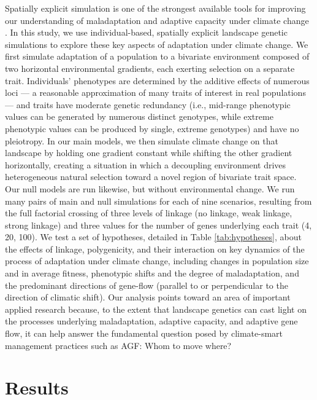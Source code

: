 \documentclass[9pt,twocolumn,twoside,lineno]{pnas-new}
\begin{document}
Spatially explicit simulation is one of the strongest available tools
for improving our understanding of maladaptation and adaptive capacity
under climate change \cite{capblancq_review}.
In this study, we use individual-based, spatially explicit landscape genetic simulations to
explore these key aspects of adaptation under climate change. We first simulate 
adaptation of a population to a bivariate environment composed of two horizontal 
environmental gradients, each exerting selection on a separate trait.
Individuals' phenotypes are determined by the additive effects of numerous loci ---
a reasonable approximation of many traits of interest in real populations \cite{sella} ---
and traits have moderate genetic redundancy 
(i.e., mid-range phenotypic values
can be generated by numerous distinct genotypes, while extreme phenotypic
values can be produced by single, extreme genotypes) and have no pleiotropy.
In our main models, we then simulate climate change on that landscape by holding one gradient 
constant while shifting the other gradient horizontally, creating a situation in which
a decoupling environment drives heterogeneous natural selection toward a novel region 
of bivariate trait space. Our null models are run likewise, but without environmental 
change. We run many pairs of main and null simulations for each of nine scenarios, 
resulting from the full factorial crossing of three levels of linkage (no linkage, weak 
linkage, strong linkage) and three values for the number of genes underlying each 
trait (4, 20, 100). We test a set of hypotheses, detailed 
in Table \ref{tab:hypotheses}, about the effects of linkage,
polygenicity, and their interaction on key 
dynamics of the process of adaptation under climate change, including changes in 
population size and in average fitness, phenotypic shifts and the degree of 
maladaptation, and the predominant directions of gene-flow (parallel to or 
perpendicular to the direction of climatic shift). Our analysis points toward an area 
of important applied research because, to the extent that landscape genetics can cast 
light on the processes underlying maladaptation, adaptive capacity, and adaptive gene
flow, it can help answer the fundamental question posed by climate-smart management 
practices such as AGF: Whom to move where?


\section*{Results}
\end{document}
